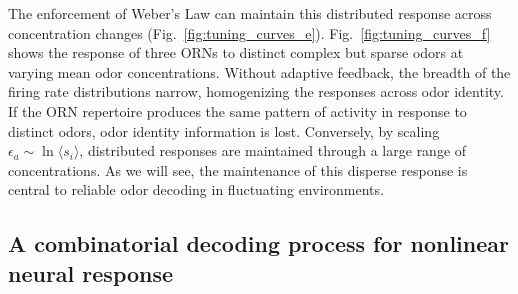 The enforcement of Weber's Law can maintain this distributed response across concentration changes (Fig.~\ref{fig:tuning_curves_e}). Fig.~\ref{fig:tuning_curves_f} shows the response of three ORNs to distinct complex but sparse odors at varying mean odor concentrations. Without adaptive feedback, the breadth of the firing rate distributions narrow, homogenizing the responses across odor identity. If the ORN repertoire produces the same pattern of activity in response to distinct odors, odor identity information is lost. Conversely, by scaling $\epsilon_a \sim \ln \langle s_i \rangle$, distributed responses are maintained through a large range of concentrations. As we will see, the maintenance of this disperse response is central to reliable odor decoding in fluctuating  environments. 









\subsection{A combinatorial decoding process for nonlinear neural response}



